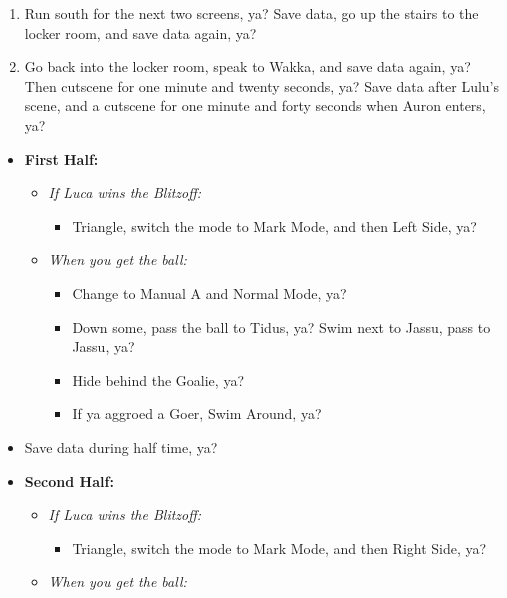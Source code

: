 \begin{enumerate}[resume]
    \item Run south for the next two screens, ya? Save data, go up the stairs to the locker room, and save data again, ya?
    \item Go back into the locker room, speak to Wakka, and save data again, ya? Then cutscene for one minute and twenty seconds, ya? Save data after Lulu's scene, and a cutscene for one minute and forty seconds when Auron enters, ya?
\end{enumerate}
\begin{blitzball}
    \begin{itemize}
        \item \textbf{First Half:}
        \begin{itemize}
            \item \textit{If Luca wins the Blitzoff:}
            \begin{itemize}
                \item Triangle, switch the mode to Mark Mode, and then Left Side, ya?
            \end{itemize}
            \item \textit{When you get the ball:}
            \begin{itemize}
                \item Change to Manual A and Normal Mode, ya?
                \item Down some, pass the ball to Tidus, ya?
                \tidusf Swim next to Jassu, pass to Jassu, ya?
                \item Hide behind the Goalie, ya?
                \item If ya aggroed a Goer, Swim Around, ya?
            \end{itemize}
        \end{itemize}
        \item Save data during half time, ya?
        \item \textbf{Second Half:}
        \begin{itemize}
            \item \textit{If Luca wins the Blitzoff:}
            \begin{itemize}
                \item Triangle, switch the mode to Mark Mode, and then Right Side, ya?
            \end{itemize}
            \item \textit{When you get the ball:}
            \begin{itemize}

\end{itemize}
\end{itemize}
\end{itemize}
\end{blitzball}
